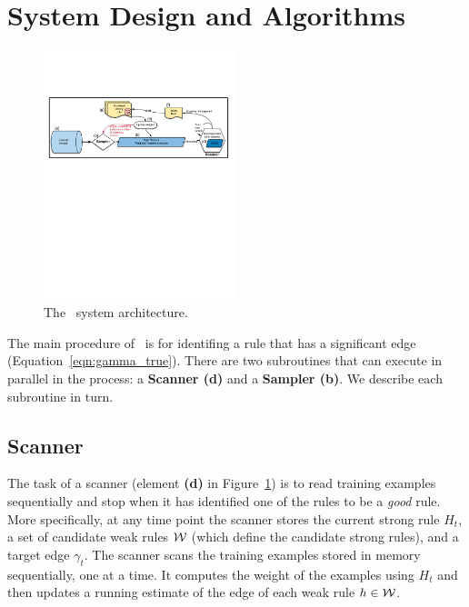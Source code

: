 \section{System Design and Algorithms} \label{sec:Algorithms}

\begin{figure}
\centering
    \includegraphics[width=0.5\textwidth]{figs/SingleMachine.pdf}
    \caption{The \Sparrow\ system architecture.}\label{fig:architecture}
    \vspace{0pt}
\end{figure}

The main procedure of \Sparrow\ is for identifing a rule that has a significant
edge (Equation~\ref{eqn:gamma_true}). There are two
subroutines that can execute in parallel in the process: a {\bf Scanner (d)} and a
{\bf Sampler (b)}. We describe each subroutine in turn.


\subsection*{Scanner}

The task of a scanner (element {\bf (d)} in Figure~\ref{fig:architecture})
is to read training examples sequentially and stop
when it has identified one of the rules to be a {\em good} rule. More
specifically, at any time point the scanner stores the current strong
rule $H_t$, a set of candidate weak rules ${\cal W}$ (which
define the candidate strong rules), and a target
edge $\gamma_t$. The scanner scans the training examples stored in
memory sequentially, one at a time. It computes the weight of the
examples using $H_t$ and then updates a running estimate of the edge
of each weak rule $h \in {\cal W}$.

